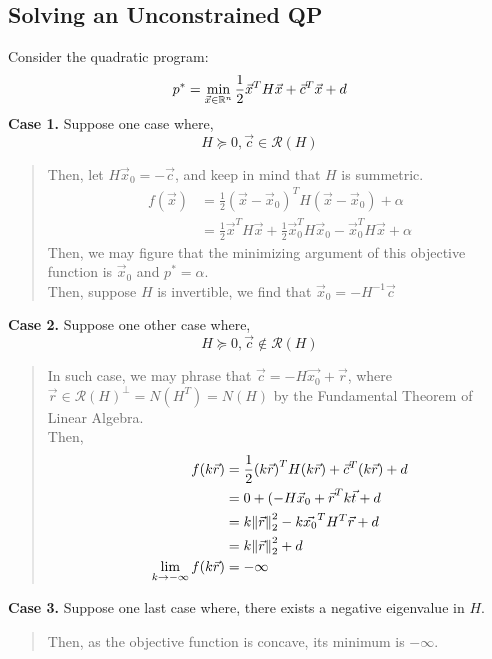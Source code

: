\subsection{Solving an Unconstrained QP}
Consider the quadratic program:
\[
    p^* = \min_{\vec{x} \in \R^n} \frac{1}{2} \vec{x}^T H \vec{x} + \vec{c} ^T \vec{x} + d
\]
\textbf{Case 1.} Suppose one case where,
\[
    H \succcurlyeq 0, \vec{c} \in \mathcal{R}(H)
\]
\begin{quote}
    Then, let $H \vec{x}_0 = -\vec{c}$, and keep in mind that $H$ is summetric.
    \begin{align*}
        f(\vec{x})
        &= \frac{1}{2} {(\vec{x} - \vec{x}_0)}^T H (\vec{x} - \vec{x}_0) + \alpha \\
        &= \frac{1}{2} \vec{x}^T H \vec{x} + \frac{1}{2} \vec{x}_0^T H \vec{x}_0 - \vec{x}_0^T H \vec{x} + \alpha
    \end{align*}
    Then, we may figure that the minimizing argument of this objective function is $\vec{x}_0$ and $p^* = \alpha$. \\
    Then, suppose $H$ is invertible, we find that $\vec{x}_0 = - H^{-1} \vec{c}$
\end{quote}
\textbf{Case 2.} Suppose one other case where,
\[
    H \succcurlyeq 0, \vec{c} \not\in \mathcal{R}(H)
\]
\begin{quote}
    In such case, we may phrase that $\vec{c} = -H \vec{x_0} + \vec{r}$, where $\vec{r} \in {\mathcal{R}(H)}^{\perp} = N(H^T) = N(H)$ by the Fundamental Theorem of Linear Algebra. \\
    Then,
    \begin{align*}
        f(k \vec{r})
        &= \frac{1}{2} {(k \vec{r})}^T H (k \vec{r}) + \vec{c}^T (k \vec{r}) + d \\
        &= 0 + {(-H \vec{x}_0 + \vec{r}}^T k \vec{t} + d \\
        &= k \pnorm[2]{\vec{r}}{2} - k \vec{x_0}^T H^T \vec{r} + d \\
        &= k \pnorm[2]{\vec{r}}{2} + d \\
        \lim_{k \rightarrow -\infty} f(k \vec{r}) &= -\infty
    \end{align*}
\end{quote}
\textbf{Case 3.} Suppose one last case where, there exists a negative eigenvalue in $H$.
\begin{quote}
    Then, as the objective function is concave, its minimum is $-\infty$.
\end{quote}
